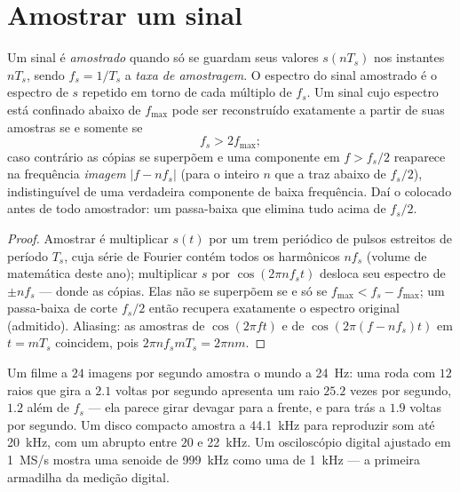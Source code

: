 \section{Amostrar um sinal}

\begin{theorem}\label{thm:b2:feedback-oscillators:shannon}
Um sinal é \emph{amostrado} quando só se guardam seus valores $s(nT_s)$ nos
instantes $nT_s$, sendo $f_s = 1/T_s$ a \emph{taxa de amostragem}.
O espectro do sinal amostrado é o espectro de $s$ repetido
em torno de cada múltiplo de $f_s$. Um sinal cujo espectro está confinado
abaixo de $f_{\max}$ pode ser reconstruído exatamente a partir de suas amostras se e
somente se
\[
f_s > 2f_{\max} ;
\]
caso contrário as cópias se superpõem e uma componente em $f > f_s/2$ reaparece
na frequência \emph{imagem} $|f - nf_s|$ (para o inteiro $n$ que
a traz abaixo de $f_s/2$), indistinguível de uma verdadeira componente de baixa
frequência. Daí o \emph{} colocado antes de todo
amostrador: um passa-baixa que elimina tudo acima de $f_s/2$.
\end{theorem}

\begin{proof}
Amostrar é multiplicar $s(t)$ por um trem periódico de pulsos estreitos de
período $T_s$, cuja série de Fourier contém todos os harmônicos $nf_s$
(volume de matemática deste ano); multiplicar $s$ por $\cos(2\pi nf_st)$
desloca seu espectro de $\pm nf_s$ --- donde as cópias. Elas não se
superpõem se e só se $f_{\max} < f_s - f_{\max}$; um passa-baixa de corte $f_s/2$ então
recupera exatamente o espectro original (admitido). Aliasing: as
amostras de $\cos(2\pi ft)$ e de $\cos(2\pi(f - nf_s)t)$ em $t = mT_s$
coincidem, pois $2\pi nf_smT_s = 2\pi nm$.
\end{proof}

\begin{example}\label{ex:b2:feedback-oscillators:alias}
Um filme a $24$ imagens por segundo amostra o mundo a \qty{24}{Hz}: uma
roda com $12$ raios que gira a $2.1$ voltas por segundo apresenta um raio
$25.2$ vezes por segundo, $1.2$ além de $f_s$ --- ela parece girar devagar
para a frente, e para trás a $1.9$ voltas por segundo. Um disco compacto amostra
a \qty{44.1}{kHz} para reproduzir som até \qty{20}{kHz}, com um  abrupto entre $20$ e \qty{22}{kHz}. Um osciloscópio digital
ajustado em \qty{1}{MS/s} mostra uma senoide de \qty{999}{kHz} como uma de \qty{1}{kHz} ---
a primeira armadilha da medição digital.
\end{example}

